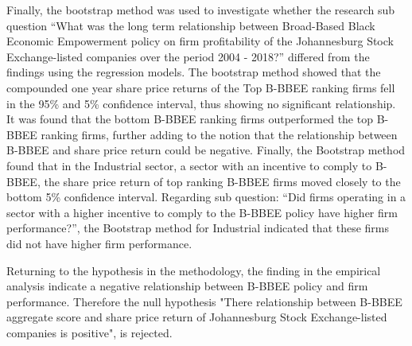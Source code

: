 Finally, the bootstrap method was used to investigate whether the research sub question “What was the long term relationship between Broad-Based Black Economic Empowerment policy on firm profitability of the Johannesburg Stock Exchange-listed companies over the period 2004 - 2018?” differed from the findings using the regression models. The bootstrap method showed that the compounded one year share price returns of the Top B-BBEE ranking firms fell in the 95\% and 5\% confidence interval, thus showing no significant relationship. It was found that the bottom B-BBEE ranking firms outperformed the top B-BBEE ranking firms, further adding to the notion that the relationship between B-BBEE and share price return could be negative. Finally, the Bootstrap method found that in the Industrial sector, a sector with an incentive to comply to B-BBEE, the share price return of top ranking B-BBEE firms moved closely to the bottom 5\% confidence interval. Regarding sub question: “Did firms operating in a sector with a higher incentive to comply to the B-BBEE policy have higher firm performance?”, the Bootstrap method for Industrial indicated that these firms did not have higher firm performance.

Returning to the hypothesis in the methodology, the finding in the empirical analysis indicate a negative relationship between B-BBEE policy and firm performance. Therefore the null hypothesis "There relationship between B-BBEE aggregate score and share price return of Johannesburg Stock Exchange-listed companies is positive", is rejected.